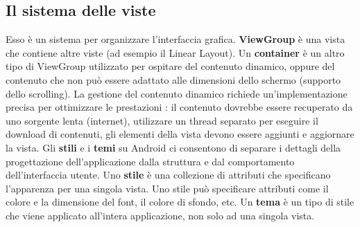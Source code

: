 \documentclass[12pt]{report}
\begin{document}
\subsection{Il sistema delle viste}
Esso è un sistema per organizzare l'interfaccia grafica. \textbf{ViewGroup} è una vista che contiene altre viste (ad esempio il Linear Layout). Un \textbf{container} è un altro tipo di ViewGroup utilizzato per ospitare del contenuto dinamico, oppure del contenuto che non può essere adattato alle dimensioni dello schermo (supporto dello scrolling). La gestione del contenuto dinamico richiede un'implementazione precisa per ottimizzare le prestazioni : il contenuto dovrebbe essere recuperato da uno sorgente lenta (internet), utilizzare un thread separato per eseguire il download di contenuti, gli elementi della vista devono essere aggiunti e aggiornare la vista. Gli \textbf{stili} e i \textbf{temi} su Android ci consentono di separare i dettagli della progettazione dell'applicazione dalla struttura e dal comportamento dell'interfaccia utente. Uno \textbf{stile} è una collezione di attributi che specificano l'apparenza per una singola vista. Uno stile può specificare attributi come il colore e la dimensione del font, il colore di sfondo, etc. Un \textbf{tema} è un tipo di stile che viene applicato all'intera applicazione, non solo ad una singola vista.
\end{document}
